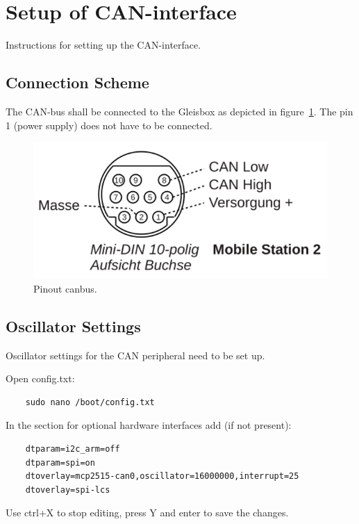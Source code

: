 \section{Setup of CAN-interface}
Instructions for setting up the CAN-interface.

\subsection{Connection Scheme}
The CAN-bus shall be connected to the Gleisbox as depicted in figure~\ref{fig:mobilestation2_din10}. The pin 1 (power supply) does not have to be connected.


\begin{figure}[h!]
	\centering
	\includegraphics[width=1.00\linewidth]{../figures/mobilestation2_din10.png}
	\caption{Pinout canbus.}
	\label{fig:mobilestation2_din10}
\end{figure}

\subsection{Oscillator Settings}
Oscillator settings for the CAN peripheral need to be set up.

Open config.txt:

\begin{verbatim}
	sudo nano /boot/config.txt
\end{verbatim}

In the section for optional hardware interfaces add (if not present):

\begin{verbatim}
	dtparam=i2c_arm=off
	dtparam=spi=on
	dtoverlay=mcp2515-can0,oscillator=16000000,interrupt=25
	dtoverlay=spi-lcs
\end{verbatim}

Use ctrl+X to stop editing, press Y and enter to save the changes.

